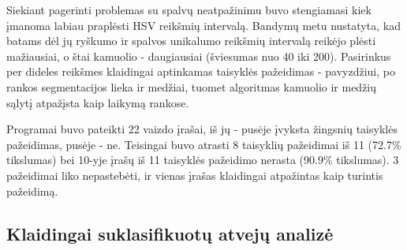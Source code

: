 \documentclass{VUMIFPSkursinis}
\begin{document}
Siekiant pagerinti problemas su spalvų neatpažinimu buvo stengiamasi kiek įmanoma labiau praplėsti HSV reikšmių intervalą. Bandymų metu nustatyta, kad batams dėl jų ryškumo ir spalvos unikalumo reikšmių intervalą reikėjo plėsti mažiausiai, o štai kamuolio - daugiausiai (šviesumas nuo 40 iki 200). Pasirinkus per dideles reikšmes klaidingai aptinkamas taisyklės pažeidimas - pavyzdžiui, po rankos segmentacijos lieka ir medžiai, tuomet algoritmas kamuolio ir medžių sąlytį atpažįsta kaip laikymą rankose.


Programai buvo pateikti 22 vaizdo įrašai, iš jų - pusėje įvyksta žingsnių taisyklės pažeidimas, pusėje - ne. Teisingai buvo atrasti 8 taisyklių pažeidimai iš 11 (72.7\% tikslumas) bei 10-yje įrašų iš 11 taisyklės pažeidimo nerasta (90.9\% tikslumas). 3 pažeidimai liko nepastebėti, ir vienas įrašas klaidingai atpažintas kaip turintis pažeidimą. 


\subsection{Klaidingai suklasifikuotų atvejų analizė}
\end{document}
